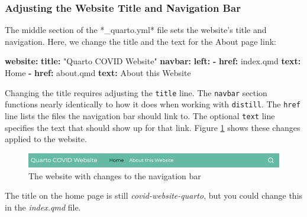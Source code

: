 \documentclass[
]{book}
\newenvironment{Shaded}{\begin{snugshade}}{\end{snugshade}}
\newcommand{\AttributeTok}[1]{\textcolor[rgb]{0.13,0.29,0.53}{#1}}
\newcommand{\FunctionTok}[1]{\textcolor[rgb]{0.13,0.29,0.53}{\textbf{#1}}}
\newcommand{\KeywordTok}[1]{\textcolor[rgb]{0.13,0.29,0.53}{\textbf{#1}}}
\newcommand{\StringTok}[1]{\textcolor[rgb]{0.31,0.60,0.02}{#1}}
\begin{document}
\hypertarget{adjusting-the-website-title-and-navigation-bar}{%
\subsubsection*{Adjusting the Website Title and Navigation Bar}\label{adjusting-the-website-title-and-navigation-bar}}

The middle section of the *\_quarto.yml* file sets the website's title and navigation. Here, we change the title and the text for the About page link:

\begin{Shaded}
\begin{Highlighting}[]
\FunctionTok{website}\KeywordTok{:}
\AttributeTok{  }\FunctionTok{title}\KeywordTok{:}\AttributeTok{ }\StringTok{"Quarto COVID Website"}
\AttributeTok{  }\FunctionTok{navbar}\KeywordTok{:}
\AttributeTok{    }\FunctionTok{left}\KeywordTok{:}
\AttributeTok{      }\KeywordTok{{-}}\AttributeTok{ }\FunctionTok{href}\KeywordTok{:}\AttributeTok{ index.qmd}
\AttributeTok{        }\FunctionTok{text}\KeywordTok{:}\AttributeTok{ Home}
\AttributeTok{      }\KeywordTok{{-}}\AttributeTok{ }\FunctionTok{href}\KeywordTok{:}\AttributeTok{ about.qmd}
\AttributeTok{        }\FunctionTok{text}\KeywordTok{:}\AttributeTok{ About this Website}
\end{Highlighting}
\end{Shaded}

Changing the title requires adjusting the \texttt{title} line. The \texttt{navbar} section functions nearly identically to how it does when working with \texttt{distill}. The \texttt{href} line lists the files the navigation bar should link to. The optional \texttt{text} line specifies the text that should show up for that link. Figure \ref{fig:quarto-website-navbar-changes} shows these changes applied to the website.

\begin{figure}
\includegraphics[width=1\linewidth]{assets/quarto-website-navbar-changes} \caption{The website with changes to the navigation bar}\label{fig:quarto-website-navbar-changes}
\end{figure}

The title on the home page is still \emph{covid-website-quarto}, but you could change this in the \emph{index.qmd} file.
\end{document}
